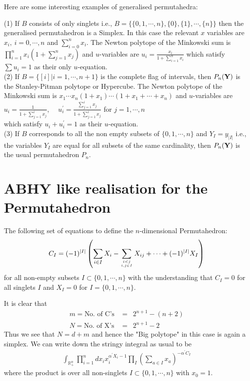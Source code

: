 \documentclass[hidelinks,12pt]{article}
\newcommand{\bea}[1]{\begin{eqnarray}\label{#1} }
\newcommand{\eea}{\end{eqnarray}}
\def\bea{\begin{eqnarray}}
\def\eea{\end{eqnarray}}
\begin{document}
Here are some interesting examples of generalised permutahedra:

(1) If $B$ consists of only singlets i.e., $B=\{ \{ 0,1,\cdots,n \}, \{ 0 \},\{ 1 \},\cdots ,\{ n \} \}$ then the generalised permutahedron is a Simplex. In this case the relevant $x$ variables are $x_i,~ i=0,\cdots,n$ and $\sum_{i=0}^n x_i$. 
The Newton polytope of the Minkowski sum is $\prod_{i=1}^{n} x_i (1+\sum_{j=1}^{n} x_j)$ and $u$-variables are 
$u_i =\frac{ x_i}{1+\sum_{i=1}^n x_i} $
which satisfy $\sum u_i =1$ as their only $u$-equation. \\

(2) If $B= \{[i] | i=1,\cdots,n+1 \}$ is the complete flag of intervals, then $P_n({\bf Y})$ is the Stanley-Pitman polytope or Hypercube.
The Newton polytope of the Minkowski sum is $x_1\cdots x_n (1+x_1) \cdots (1+x_1+\cdots +x_n)$ and $u$-variables are 
$u_i =\frac{ 1}{1+\sum_{j=1}^{i} x_j} $, ~~$u^{'}_i =\frac{ \sum_{j=1}^{i} x_j}{1+\sum_{j=1}^{i} x_j} $ for $j=1,\cdots,n$ \\
which satisfy $u_i +u^{'}_{i} =1$ as their $u$-equation. \\

(3) If $B$ corresponds to all the non empty subsets of $\{0,1,\cdots,n \}$ and $Y_I =y_{|I|}$ i.e., the variables $Y_I$ are equal for all subsets of the same cardinality, then $P_n({\bf Y})$ is the usual permutahedron $P_n$. 

\section*{ABHY like realisation for the Permutahedron}
The following set of equations to define the $n$-dimensional Permutahedron: 
\bea
C_I = (-1)^{|I|} \left( \sum_{i \in I} X_i - \sum _{{i<j}\atop{i,j \in I}} X_{ij} +\cdots + (-1)^{|I|}  X_I \right) \nonumber
\eea
for all non-empty subsets $I \subset \{0,1,\cdots,n\}$ with the understanding that $C_{I} =0$ for all singlets $I$ and $X_{I} =0$ for $I=\{ 0,1,\cdots,n \}$. 

It is clear that
\bea
m= \text{No. of  C's }&=& 2^{n+1}-(n+2) \nonumber \\
N= \text{No. of X's} &=& 2^{n+1}- 2 \nonumber 
\eea
Thus we see that $N= d+m$ and hence the "Big polytope" in this case is again a simplex. We can write down the stringy integral as usual to be 
\bea
\int_{\mathbb{R}^{n}_{+}} \prod_{i =1}^{n} d x_i x_i^{\alpha^{'} X_i -1} \prod_{I} \left (\sum_{a\in I} x_a \right) ^{-\alpha^{'} C_I} \nonumber
\eea 
where the product is over all non-singlets $ I \subset \{0,1,\cdots,n\}$ with $x_{0} =1$.
\end{document}
